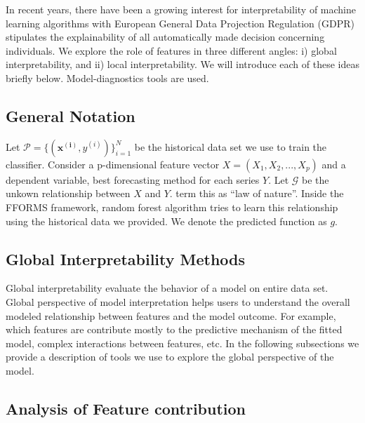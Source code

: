 \documentclass[11pt,a4paper,]{article}
\theoremstyle{definition}
\theoremstyle{definition}
\theoremstyle{definition}
\theoremstyle{remark}
\begin{document}
In recent years, there have been a growing interest for interpretability
of machine learning algorithms with European General Data Projection
Regulation (GDPR) stipulates the explainability of all automatically
made decision concerning individuals. We explore the role of features in
three different angles: i) global interpretability, and ii) local
interpretability. We will introduce each of these ideas briefly below.
Model-diagnostics tools are used.

\subsection{General Notation}\label{general-notation}

Let \(\mathcal{P}=\{(\mathbf{x^{(i)}}, y^{(i)})\}_{i=1}^{N}\) be the
historical data set we use to train the classifier. Consider a
p-dimensional feature vector \(X=(X_1, X_2, ..., X_p)\) and a dependent
variable, best forecasting method for each series \(Y\). Let
\(\mathcal{G}\) be the unkown relationship between \(X\) and \(Y\).
\textcite{Zhao} term this as ``law of nature''. Inside the FFORMS
framework, random forest algorithm tries to learn this relationship
using the historical data we provided. We denote the predicted function
as \(g\).

\subsection{Global Interpretability
Methods}\label{global-interpretability-methods}

Global interpretability evaluate the behavior of a model on entire data
set. Global perspective of model interpretation helps users to
understand the overall modeled relationship between features and the
model outcome. For example, which features are contribute mostly to the
predictive mechanism of the fitted model, complex interactions between
features, etc. In the following subsections we provide a description of
tools we use to explore the global perspective of the model.

\subsection{Analysis of Feature
contribution}\label{analysis-of-feature-contribution}
\end{document}
